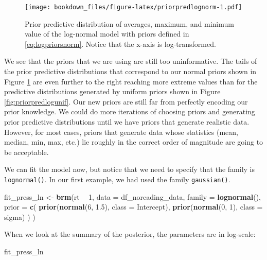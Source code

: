 \documentclass[12pt,]{krantz}
\newenvironment{Shaded}{\begin{snugshade}}{\end{snugshade}}
\newcommand{\DataTypeTok}[1]{\textcolor[rgb]{0.13,0.29,0.53}{#1}}
\newcommand{\DecValTok}[1]{\textcolor[rgb]{0.00,0.00,0.81}{#1}}
\newcommand{\FloatTok}[1]{\textcolor[rgb]{0.00,0.00,0.81}{#1}}
\newcommand{\KeywordTok}[1]{\textcolor[rgb]{0.13,0.29,0.53}{\textbf{#1}}}
\newcommand{\NormalTok}[1]{#1}
\newcommand{\OperatorTok}[1]{\textcolor[rgb]{0.81,0.36,0.00}{\textbf{#1}}}
\newcommand{\StringTok}[1]{\textcolor[rgb]{0.31,0.60,0.02}{#1}}
\theoremstyle{definition}
\theoremstyle{definition}
\theoremstyle{definition}
\theoremstyle{remark}
\begin{document}
\begin{figure}
\centering
\texttt{[image: bookdown\_files/figure-latex/priorpredlognorm-1.pdf]}
\caption{\label{fig:priorpredlognorm}Prior predictive distribution of averages, maximum, and minimum value of the log-normal model with priors defined in \eqref{eq:logpriorsnorm}. Notice that the x-axis is log-transformed.}
\end{figure}

We see that the priors that we are using are still too uninformative. The tails of the prior predictive distributions that correspond to our normal priors shown in Figure \ref{fig:priorpredlognorm} are even further to the right reaching more extreme values than for the predictive distributions generated by uniform priors shown in Figure \ref{fig:priorpredlogunif}. Our new priors are still far from perfectly encoding our prior knowledge. We could do more iterations of choosing priors and generating prior predictive distributions until we have priors that generate realistic data. However, for most cases, priors that generate data whose statistics (mean, median, min, max, etc.) lie roughly in the correct order of magnitude are going to be acceptable.

We can fit the model now, but notice that we need to specify that the family is \texttt{lognormal()}. In our first example, we had used the family \texttt{gaussian()}.

\begin{Shaded}
\begin{Highlighting}[]
\NormalTok{fit_press_ln <-}\StringTok{ }\KeywordTok{brm}\NormalTok{(rt }\OperatorTok{~}\StringTok{ }\DecValTok{1}\NormalTok{,}
  \DataTypeTok{data =}\NormalTok{ df_noreading_data,}
  \DataTypeTok{family =} \KeywordTok{lognormal}\NormalTok{(),}
  \DataTypeTok{prior =} \KeywordTok{c}\NormalTok{(}
    \KeywordTok{prior}\NormalTok{(}\KeywordTok{normal}\NormalTok{(}\DecValTok{6}\NormalTok{, }\FloatTok{1.5}\NormalTok{), }\DataTypeTok{class =}\NormalTok{ Intercept),}
    \KeywordTok{prior}\NormalTok{(}\KeywordTok{normal}\NormalTok{(}\DecValTok{0}\NormalTok{, }\DecValTok{1}\NormalTok{), }\DataTypeTok{class =}\NormalTok{ sigma)}
\NormalTok{  )}
\NormalTok{)}
\end{Highlighting}
\end{Shaded}

When we look at the summary of the posterior, the parameters are in log-scale:

\begin{Shaded}
\begin{Highlighting}[]
\NormalTok{fit_press_ln}
\end{Highlighting}
\end{Shaded}
\end{document}
